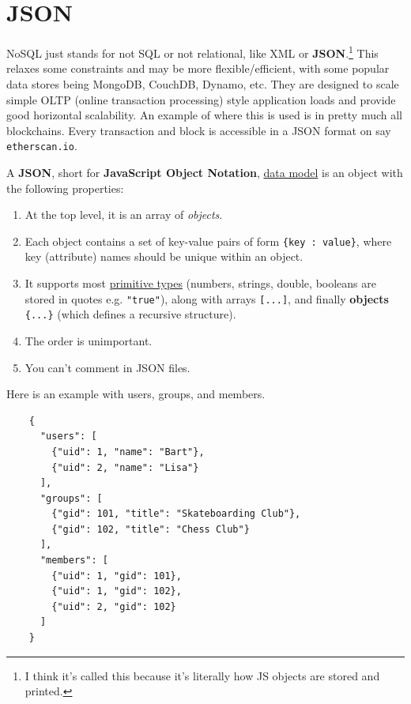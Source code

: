 \section{JSON}

NoSQL just stands for not SQL or not relational, like XML or \textbf{JSON}.\footnote{I think it's called this because it's literally how JS objects are stored and printed.} This relaxes some constraints and may be more flexible/efficient, with some popular data stores being MongoDB, CouchDB, Dynamo, etc. They are designed to scale simple OLTP (online transaction processing) style application loads and provide good horizontal scalability. An example of where this is used is in pretty much all blockchains. Every transaction and block is accessible in a JSON format on say \texttt{etherscan.io}. 

\begin{definition}[JSON]
  \label{def:json}
  A \textbf{JSON}, short for \textbf{JavaScript Object Notation}, \hyperref[def:data-model]{data model} is an object with the following properties: 
  \begin{enumerate} 
    \item At the top level, it is an array of \textit{objects}. 
    \item Each object contains a set of key-value pairs of form \texttt{\{key : value\}}, where key (attribute) names should be unique within an object. 
    \item It supports most \hyperref[def:primitive-types]{primitive types} (numbers, strings, double, booleans are stored in quotes e.g. \texttt{"true"}), along with arrays \texttt{[...]}, and finally \textbf{objects} \texttt{\{...\}} (which defines a recursive structure). 
    \item The order is unimportant. 
    \item You can't comment in JSON files. 
  \end{enumerate}
\end{definition}

\begin{example}
  \label{ex:example-json}
  Here is an example with users, groups, and members. 
  \begin{lstlisting}
    {
      "users": [
        {"uid": 1, "name": "Bart"},
        {"uid": 2, "name": "Lisa"}
      ],
      "groups": [
        {"gid": 101, "title": "Skateboarding Club"},
        {"gid": 102, "title": "Chess Club"}
      ],
      "members": [
        {"uid": 1, "gid": 101},
        {"uid": 1, "gid": 102},
        {"uid": 2, "gid": 102}
      ]
    } 
  \end{lstlisting}
\end{example}

